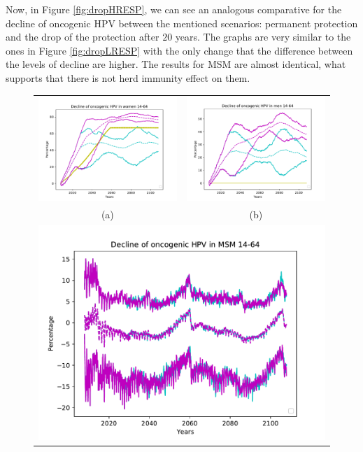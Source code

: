 Now, in Figure \ref{fig:dropHRESP}, we can see an analogous comparative for the decline of oncogenic HPV between the mentioned scenarios: permanent protection and the drop of the protection after $20$ years. The graphs are very similar to the ones in Figure \ref{fig:dropLRESP} with the only change that the difference between the levels of decline are higher. The results for MSM are almost identical, what supports that there is not herd immunity effect on them.

\begin{figure}[!]
	\centering
	\begin{tabular}{cc}
		\includegraphics[width=0.5\linewidth]{IMGs/6.-Caida_brusca/onco_muj.pdf}	& 
		\includegraphics[width=0.5\linewidth]{IMGs/6.-Caida_brusca/onco_hom.pdf}  \\ 
		(a)	& (b) \\ 
		\multicolumn{2}{c}{ \includegraphics[width=0.6\linewidth]{IMGs/6.-Caida_brusca/onco_MSM.pdf} } \\ 

\end{tabular}
\end{figure}
